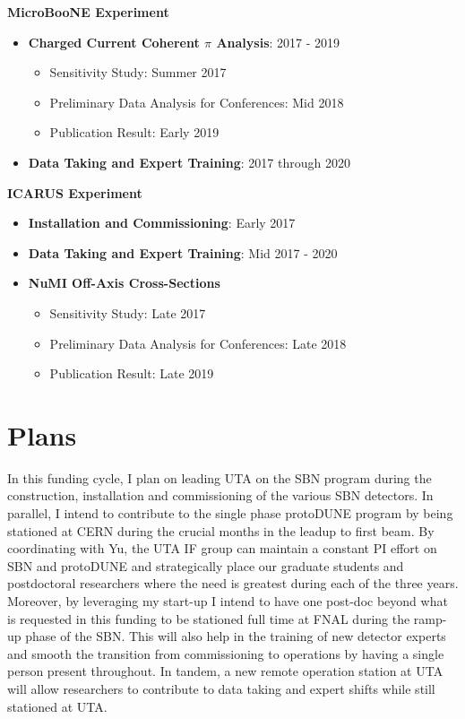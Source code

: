 \noindent\textbf{MicroBooNE Experiment}
\begin{itemize}[noitemsep,nolistsep]
\item{\textbf{Charged Current Coherent $\pi$ Analysis}}: 2017 - 2019
\begin{itemize}[noitemsep,nolistsep]
\item{Sensitivity Study: Summer 2017}
\item{Preliminary Data Analysis for Conferences: Mid 2018}
\item{Publication Result: Early 2019}
\end{itemize}

\item{\textbf{Data Taking and Expert Training}}: 2017 through 2020

\end{itemize}


\noindent\textbf{ICARUS Experiment}

\begin{itemize}[noitemsep,nolistsep]
\item{\textbf{Installation and Commissioning}}: Early 2017
\item{\textbf{Data Taking and Expert Training}}: Mid 2017 - 2020
\item{\textbf{NuMI Off-Axis Cross-Sections}}
\begin{itemize}[noitemsep,nolistsep]
\item{Sensitivity Study: Late 2017}
\item{Preliminary Data Analysis for Conferences: Late 2018}
\item{Publication Result: Late 2019}
\end{itemize}

\end{itemize}

\section*{\textbf{Plans}}
In this funding cycle, I plan on leading UTA on the SBN program during the construction, installation and commissioning of the various SBN detectors. In parallel, I intend to contribute to the single phase protoDUNE program by being stationed at CERN during the crucial months in the leadup to first beam. By coordinating with Yu, the UTA IF group can maintain a constant PI effort on SBN and protoDUNE and strategically place our graduate students and postdoctoral researchers where the need is greatest during each of the three years. Moreover, by leveraging my start-up I intend to have one post-doc beyond what is requested in this funding to be stationed full time at FNAL during the ramp-up phase of the SBN. This will also help in the training of new detector experts and smooth the transition from commissioning to operations by having a single person present throughout. In tandem, a new remote operation station at UTA will allow researchers to contribute to data taking and expert shifts while still stationed at UTA. 


